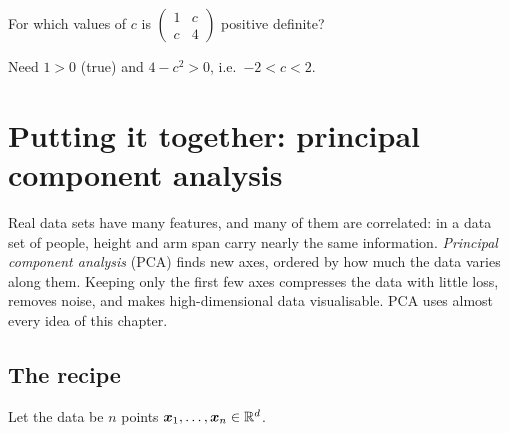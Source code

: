 \begin{exercise}
For which values of $c$ is $\left(\begin{smallmatrix} 1 & c\\ c &
4\end{smallmatrix}\right)$ positive definite?
\end{exercise}
\begin{solution}
Need $1 > 0$ (true) and $4 - c^2 > 0$, i.e.\ $-2 < c < 2$.
\end{solution}

\section{Putting it together: principal component analysis}\label{sec:pca}

\begin{motivation}
Real data sets have many features, and many of them are correlated: in a data
set of people, height and arm span carry nearly the same information.
\emph{Principal component analysis} (PCA) finds new axes, ordered by how much
the data varies along them. Keeping only the first few axes compresses the data
with little loss, removes noise, and makes high-dimensional data
visualisable. PCA uses almost every idea of this chapter.
\end{motivation}

\subsection{The recipe}

Let the data be $n$ points $\bm{x}_1, \dots, \bm{x}_n \in \mathbb{R}^d$.

